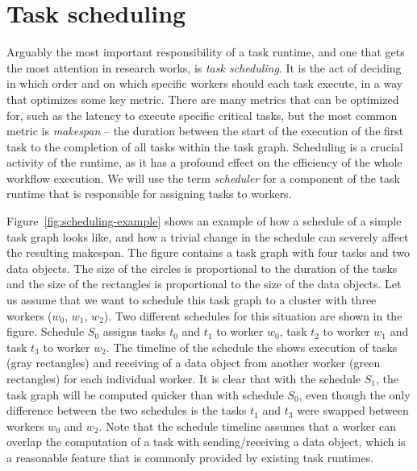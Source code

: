 \section{Task scheduling}
Arguably the most important responsibility of a task runtime, and one that gets the most attention
in research works, is \emph{task scheduling}. It is the act of deciding in which order and on which
specific workers should each task execute, in a way that optimizes some key metric. There are many
metrics that can be optimized for, such as the latency to execute specific critical tasks, but the
most common metric is \emph{makespan} -- the duration between the start of the execution of
the first task to the completion of all tasks within the task graph. Scheduling is a crucial
activity of the runtime, as it has a profound effect on the efficiency of the whole workflow
execution. We will use the term \emph{scheduler} for a component of the task runtime that is
responsible for assigning tasks to workers.

Figure~\ref{fig:scheduling-example} shows an example of how a schedule of a simple task graph looks like,
and how a trivial change in the schedule can severely affect the resulting makespan. The figure
contains a task graph with four tasks and two data objects. The size of the circles is proportional
to the duration of the tasks and the size of the rectangles is proportional to the size of the data
objects. Let us assume that we want to schedule this task graph to a cluster with three workers
($w_0$, $w_1$, $w_2$). Two different schedules
for this situation are shown in the figure. Schedule $S_0$ assigns tasks
$t_0$ and $t_1$ to worker $w_0$, task
$t_2$ to worker $w_1$ and task $t_3$ to worker
$w_2$. The timeline of the schedule the shows execution of tasks (gray rectangles)
and receiving of a data object from another worker (green rectangles) for each individual worker.
It is clear that with the schedule $S_1$, the task graph will be computed quicker
than with schedule $S_0$, even though the only difference between the two
schedules is the tasks $t_1$ and $t_3$ were swapped between
workers $w_0$ and $w_2$. Note that the schedule timeline assumes
that a worker can overlap the computation of a task with sending/receiving a data object, which is
a reasonable feature that is commonly provided by existing task runtimes.

